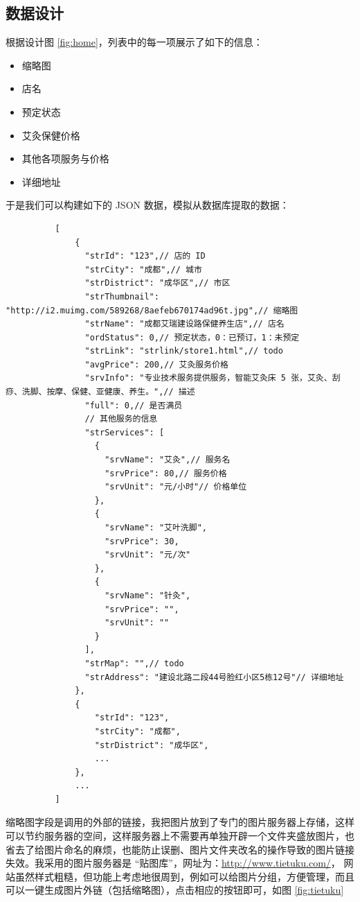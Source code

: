     \subsection{数据设计}
      \label{subsec:数据设计}
        根据设计图 \ref{fig:home}，列表中的每一项展示了如下的信息：
        \begin{itemize}
          \item 缩略图
          \item 店名
          \item 预定状态
          \item 艾灸保健价格
          \item 其他各项服务与价格
          \item 详细地址
        \end{itemize}
        于是我们可以构建如下的 JSON 数据，模拟从数据库提取的数据：
        \begin{lstlisting}
          [
              {
                "strId": "123",// 店的 ID
                "strCity": "成都",// 城市
                "strDistrict": "成华区",// 市区
                "strThumbnail": "http://i2.muimg.com/589268/8aefeb670174ad96t.jpg",// 缩略图
                "strName": "成都艾瑞建设路保健养生店",// 店名
                "ordStatus": 0,// 预定状态，0：已预订，1：未预定
                "strLink": "strlink/store1.html",// todo
                "avgPrice": 200,// 艾灸服务价格
                "srvInfo": "专业技术服务提供服务，智能艾灸床 5 张，艾灸、刮痧、洗脚、按摩、保健、亚健康、养生。",// 描述
                "full": 0,// 是否满员
                // 其他服务的信息
                "strServices": [
                  {
                    "srvName": "艾灸",// 服务名
                    "srvPrice": 80,// 服务价格
                    "srvUnit": "元/小时"// 价格单位
                  },
                  {
                    "srvName": "艾叶洗脚",
                    "srvPrice": 30,
                    "srvUnit": "元/次"
                  },
                  {
                    "srvName": "针灸",
                    "srvPrice": "",
                    "srvUnit": ""
                  }
                ],
                "strMap": "",// todo
                "strAddress": "建设北路二段44号脸红小区5栋12号"// 详细地址
              },
              {
                  "strId": "123",
                  "strCity": "成都",
                  "strDistrict": "成华区",
                  ...
              },
              ...
          ]
        \end{lstlisting}
        缩略图字段是调用的外部的链接，我把图片放到了专门的图片服务器上存储，这样可以节约服务器的空间，这样服务器上不需要再单独开辟一个文件夹盛放图片，也省去了给图片命名的麻烦，也能防止误删、图片文件夹改名的操作导致的图片链接失效。我采用的图片服务器是 “贴图库”，网址为：\url{http://www.tietuku.com/}， 网站虽然样式粗糙，但功能上考虑地很周到，例如可以给图片分组，方便管理，而且可以一键生成图片外链（包括缩略图），点击相应的按钮即可，如图 \ref{fig:tietuku}
